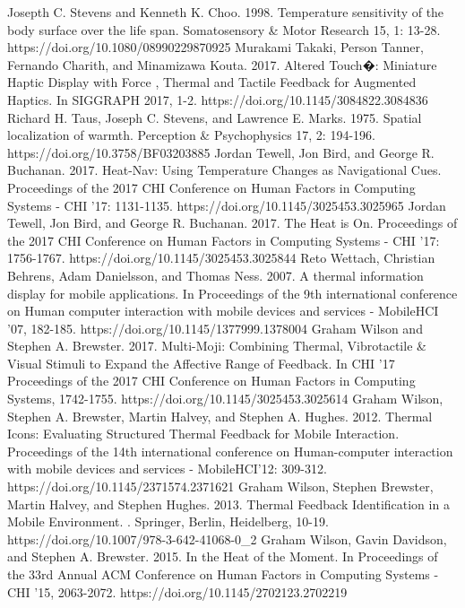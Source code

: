 \documentclass[preprint,12pt]{elsarticle}
\begin{document}
\begin{thebibliography}{00}
Josepth C. Stevens and Kenneth K. Choo. 1998. Temperature sensitivity of the body surface over the life span. Somatosensory \& Motor Research 15, 1: 13-28. https://doi.org/10.1080/08990229870925
Murakami Takaki, Person Tanner, Fernando Charith, and Minamizawa Kouta. 2017. Altered Touch�: Miniature Haptic Display with Force , Thermal and Tactile Feedback for Augmented Haptics. In SIGGRAPH 2017, 1-2. https://doi.org/10.1145/3084822.3084836
Richard H. Taus, Joseph C. Stevens, and Lawrence E. Marks. 1975. Spatial localization of warmth. Perception \& Psychophysics 17, 2: 194-196. https://doi.org/10.3758/BF03203885
Jordan Tewell, Jon Bird, and George R. Buchanan. 2017. Heat-Nav: Using Temperature Changes as Navigational Cues. Proceedings of the 2017 CHI Conference on Human Factors in Computing Systems - CHI '17: 1131-1135. https://doi.org/10.1145/3025453.3025965
Jordan Tewell, Jon Bird, and George R. Buchanan. 2017. The Heat is On. Proceedings of the 2017 CHI Conference on Human Factors in Computing Systems - CHI '17: 1756-1767. https://doi.org/10.1145/3025453.3025844
Reto Wettach, Christian Behrens, Adam Danielsson, and Thomas Ness. 2007. A thermal information display for mobile applications. In Proceedings of the 9th international conference on Human computer interaction with mobile devices and services - MobileHCI '07, 182-185. https://doi.org/10.1145/1377999.1378004
Graham Wilson and Stephen A. Brewster. 2017. Multi-Moji: Combining Thermal, Vibrotactile \& Visual Stimuli to Expand the Affective Range of Feedback. In CHI '17 Proceedings of the 2017 CHI Conference on Human Factors in Computing Systems, 1742-1755. https://doi.org/10.1145/3025453.3025614
Graham Wilson, Stephen A. Brewster, Martin Halvey, and Stephen A. Hughes. 2012. Thermal Icons: Evaluating Structured Thermal Feedback for Mobile Interaction. Proceedings of the 14th international conference on Human-computer interaction with mobile devices and services - MobileHCI'12: 309-312. https://doi.org/10.1145/2371574.2371621
Graham Wilson, Stephen Brewster, Martin Halvey, and Stephen Hughes. 2013. Thermal Feedback Identification in a Mobile Environment. . Springer, Berlin, Heidelberg, 10-19. https://doi.org/10.1007/978-3-642-41068-0\_2
Graham Wilson, Gavin Davidson, and Stephen A. Brewster. 2015. In the Heat of the Moment. In Proceedings of the 33rd Annual ACM Conference on Human Factors in Computing Systems - CHI '15, 2063-2072. https://doi.org/10.1145/2702123.2702219

\end{thebibliography}
\end{document}
